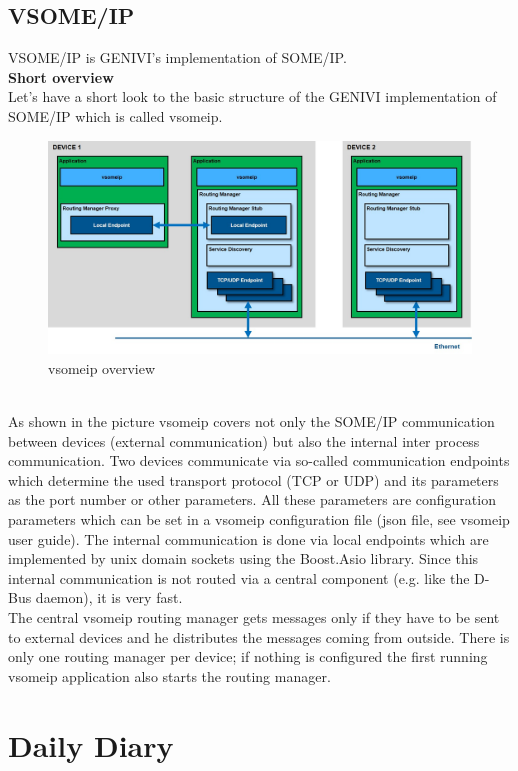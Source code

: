 \documentclass{fisattraining}
\begin{document}
\section{VSOME/IP}
VSOME/IP is GENIVI's implementation of SOME/IP.\\
\textbf{Short overview}\\
Let's have a short look to the basic structure of the GENIVI implementation of SOME/IP which is called vsomeip.
\begin{figure}[h!]
\begin{center}
\includegraphics[scale=.5]{vsomeipOverview}
\caption{vsomeip overview}
\end{center}
\end{figure}\\
As shown in the picture vsomeip covers not only the SOME/IP communication between devices (external communication) but also the internal inter process communication. Two devices communicate via so-called communication endpoints which determine the used transport protocol (TCP or UDP) and its parameters as the port number or other parameters. All these parameters are configuration parameters which can be set in a vsomeip configuration file (json file, see vsomeip user guide). The internal communication is done via local endpoints which are implemented by unix domain sockets using the Boost.Asio library. Since this internal communication is not routed via a central component (e.g. like the D-Bus daemon), it is very fast.\\
The central vsomeip routing manager gets messages only if they have to be sent to external devices and he distributes the messages coming from outside. There is only one routing manager per device; if nothing is configured the first running vsomeip application also starts the routing manager.
\chapter{Daily Diary}
\end{document}
